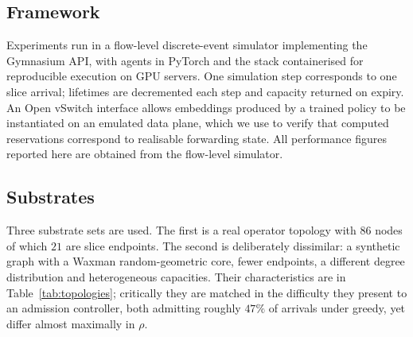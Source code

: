 \documentclass[10pt,journal,comsoc]{IEEEtran}
\begin{document}
\subsection{Framework}
Experiments run in a flow-level discrete-event simulator implementing the
Gymnasium API, with agents in PyTorch and the stack containerised for
reproducible execution on GPU servers. One simulation step corresponds to
one slice arrival; lifetimes are decremented each step and capacity
returned on expiry. An Open vSwitch interface allows embeddings produced
by a trained policy to be instantiated on an emulated data plane, which we
use to verify that computed reservations correspond to realisable
forwarding state. All performance figures reported here are obtained from
the flow-level simulator.

\subsection{Substrates}
Three substrate sets are used. The first is a real operator topology with
$86$ nodes of which $21$ are slice endpoints. The second is deliberately
dissimilar: a synthetic graph with a Waxman random-geometric core, fewer
endpoints, a different degree distribution and heterogeneous capacities.
Their characteristics are in Table~\ref{tab:topologies}; critically they
are matched in the difficulty they present to an admission controller,
both admitting roughly $47\%$ of arrivals under greedy, yet differ almost
maximally in $\rho$.
\end{document}

